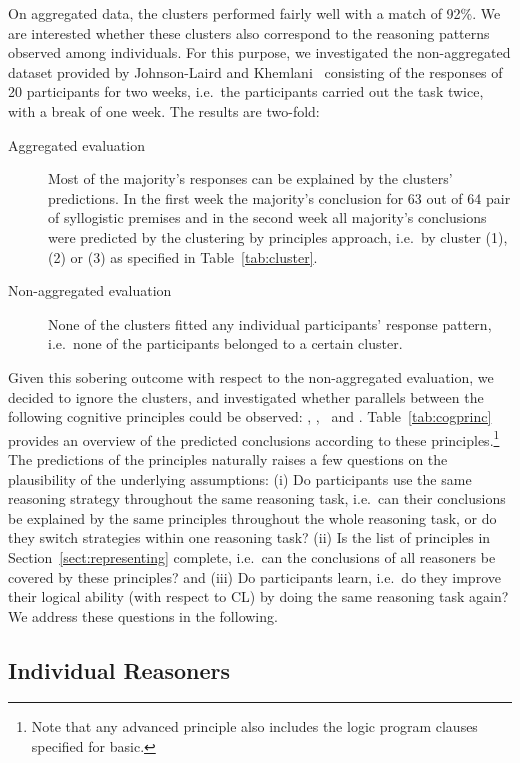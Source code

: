 \documentclass[12pt]{article}
\begin{document}
On aggregated data, the clusters performed fairly well with a match of 92\;\%. 
We are interested whether these clusters also correspond to the reasoning patterns observed among individuals. 
For this purpose, we investigated the non-aggregated dataset provided by Johnson-Laird and Khemlani~\cite{khemlani:2016} consisting of the responses of 20 participants for two weeks,
i.e.\ the participants carried out the task twice, with a break of one week. 
The results are two-fold:
\begin{description}
 \item[Aggregated evaluation] Most of the majority's responses can be explained by the clusters' predictions. In the first week 
 the majority's conclusion for 63 out of 64 pair of syllogistic premises and in the second week
 all majority's conclusions were predicted by the clustering by principles approach, i.e.\
 by cluster (1), (2) or (3) as specified in Table~\ref{tab:cluster}.
\item[Non-aggregated evaluation] None of the clusters fitted any individual participants' response pattern, i.e.\ none of the participants belonged to a certain cluster.
\end{description}

Given this sobering outcome with respect to the non-aggregated evaluation, 
we decided to ignore the clusters, and investigated whether parallels between the following cognitive principles could be observed: \basic, \contraposition, \abduction\ and \negFailure.
Table~\ref{tab:cogprinc} provides an overview of the predicted conclusions according to these principles.\footnote{Note that any advanced principle also includes the logic program clauses specified for \textsf{basic}.}
The predictions of the principles naturally raises a few questions on the plausibility of 
the underlying assumptions:
(i) Do participants use the same reasoning strategy throughout the same reasoning task, i.e.\ 
can their conclusions be 
explained by  the same principles throughout the whole reasoning task, or do they switch strategies within one reasoning task?
(ii) Is the list of principles in Section~\ref{sect:representing} complete, i.e.\ can the conclusions of all reasoners be covered
 by these principles? and
(iii) Do participants learn, i.e.\ do they improve their logical ability (with respect to CL) by doing the same reasoning task again?
We address these questions in the following.


\subsection{Individual Reasoners} \label{sect:nonag}
\end{document}

